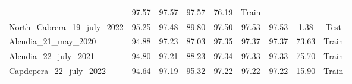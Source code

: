 \begin{table}[H]
{\begin{tabular}{lcccccccc}
                                                   & 97.57
                                                   & 97.57
                                                   & 97.57
                                                   & 76.19
                                                   & {\color[HTML]{66c2a5}
                    Train}
            \\
            North\_Cabrera\_19\_july\_2022         & 95.25
                                                   & 97.48
                                                   & 89.80
                                                   & 97.50
                                                   & 97.53
                                                   & 97.53
                                                   & 1.38
                                                   & {\color[HTML]{fc8d62}
                    Test}
            \\
            Alcudia\_21\_may\_2020                 & 94.88
                                                   & 97.23
                                                   & 87.03
                                                   & 97.35
                                                   & 97.37
                                                   & 97.37
                                                   & 73.63
                                                   & {\color[HTML]{66c2a5}
                    Train}
            \\
            Alcudia\_22\_july\_2021                & 94.80
                                                   & 97.21
                                                   & 88.23
                                                   & 97.34
                                                   & 97.33
                                                   & 97.33
                                                   & 75.70
                                                   & {\color[HTML]{66c2a5}
                    Train}
            \\
            Capdepera\_22\_july\_2022              & 94.64
                                                   & 97.19
                                                   & 95.32
                                                   & 97.22
                                                   & 97.22
                                                   & 97.22
                                                   & 15.90
                                                   & {\color[HTML]{66c2a5}
                    Train}

\end{tabular}}
\end{table}

